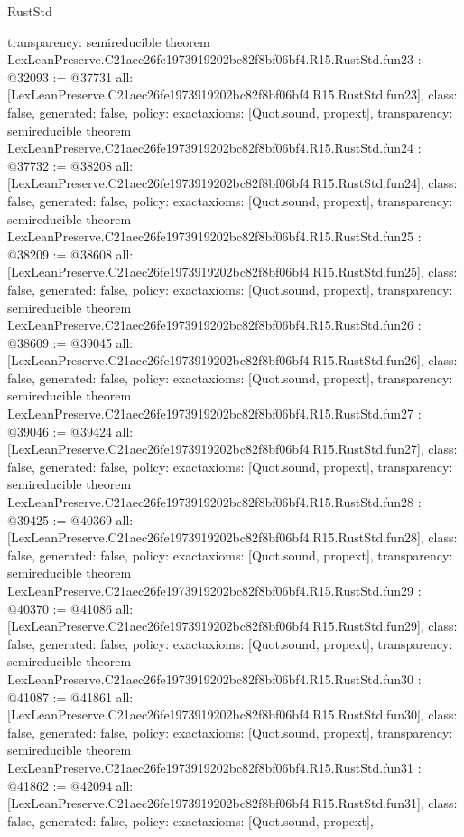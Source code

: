 \begin{lexlean}{RustStd}
\begin{coremodule}
{  transparency: semireducible
}
theorem LexLeanPreserve.C21aec26fe1973919202bc82f8bf06bf4.R15.RustStd.fun23 : @32093 := @37731 {
  all: [LexLeanPreserve.C21aec26fe1973919202bc82f8bf06bf4.R15.RustStd.fun23],
  class: false,
  generated: false,
  policy: exact{axioms: [Quot.sound, propext]},
  transparency: semireducible
}
theorem LexLeanPreserve.C21aec26fe1973919202bc82f8bf06bf4.R15.RustStd.fun24 : @37732 := @38208 {
  all: [LexLeanPreserve.C21aec26fe1973919202bc82f8bf06bf4.R15.RustStd.fun24],
  class: false,
  generated: false,
  policy: exact{axioms: [Quot.sound, propext]},
  transparency: semireducible
}
theorem LexLeanPreserve.C21aec26fe1973919202bc82f8bf06bf4.R15.RustStd.fun25 : @38209 := @38608 {
  all: [LexLeanPreserve.C21aec26fe1973919202bc82f8bf06bf4.R15.RustStd.fun25],
  class: false,
  generated: false,
  policy: exact{axioms: [Quot.sound, propext]},
  transparency: semireducible
}
theorem LexLeanPreserve.C21aec26fe1973919202bc82f8bf06bf4.R15.RustStd.fun26 : @38609 := @39045 {
  all: [LexLeanPreserve.C21aec26fe1973919202bc82f8bf06bf4.R15.RustStd.fun26],
  class: false,
  generated: false,
  policy: exact{axioms: [Quot.sound, propext]},
  transparency: semireducible
}
theorem LexLeanPreserve.C21aec26fe1973919202bc82f8bf06bf4.R15.RustStd.fun27 : @39046 := @39424 {
  all: [LexLeanPreserve.C21aec26fe1973919202bc82f8bf06bf4.R15.RustStd.fun27],
  class: false,
  generated: false,
  policy: exact{axioms: [Quot.sound, propext]},
  transparency: semireducible
}
theorem LexLeanPreserve.C21aec26fe1973919202bc82f8bf06bf4.R15.RustStd.fun28 : @39425 := @40369 {
  all: [LexLeanPreserve.C21aec26fe1973919202bc82f8bf06bf4.R15.RustStd.fun28],
  class: false,
  generated: false,
  policy: exact{axioms: [Quot.sound, propext]},
  transparency: semireducible
}
theorem LexLeanPreserve.C21aec26fe1973919202bc82f8bf06bf4.R15.RustStd.fun29 : @40370 := @41086 {
  all: [LexLeanPreserve.C21aec26fe1973919202bc82f8bf06bf4.R15.RustStd.fun29],
  class: false,
  generated: false,
  policy: exact{axioms: [Quot.sound, propext]},
  transparency: semireducible
}
theorem LexLeanPreserve.C21aec26fe1973919202bc82f8bf06bf4.R15.RustStd.fun30 : @41087 := @41861 {
  all: [LexLeanPreserve.C21aec26fe1973919202bc82f8bf06bf4.R15.RustStd.fun30],
  class: false,
  generated: false,
  policy: exact{axioms: [Quot.sound, propext]},
  transparency: semireducible
}
theorem LexLeanPreserve.C21aec26fe1973919202bc82f8bf06bf4.R15.RustStd.fun31 : @41862 := @42094 {
  all: [LexLeanPreserve.C21aec26fe1973919202bc82f8bf06bf4.R15.RustStd.fun31],
  class: false,
  generated: false,
  policy: exact{axioms: [Quot.sound, propext]},
}
\end{coremodule}
\end{lexlean}
